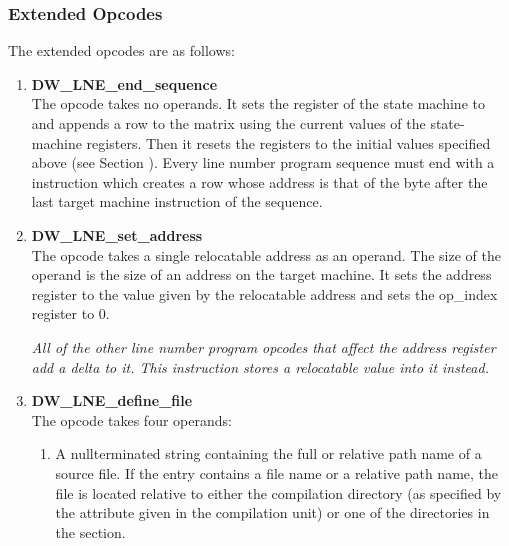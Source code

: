 \subsubsection{Extended Opcodes}
\label{chap:extendedopcodes}

The extended opcodes are as follows:

\begin{enumerate}[1. ]

\item \textbf{DW\-\_LNE\-\_end\-\_sequence} \\
The  opcode takes no operands. It sets the
register of the state machine to  and
appends a row to the matrix using the current values of the
state-machine registers. Then it resets the registers to the
initial values specified above 
(see Section ). 
Every line
number program sequence must end with a 
instruction which creates a row whose address is that of the
byte after the last target machine instruction of the sequence.

\item \textbf{DW\-\_LNE\-\_set\-\_address} \\
The  opcode takes a single relocatable
address as an operand. The size of the operand is the size
of an address on the target machine. It sets the address
register to the value given by the relocatable address and
sets the op\_index register to 0.

\textit{All of the other line number program opcodes that
affect the address register add a delta to it. This instruction
stores a relocatable value into it instead.}

\item \textbf{DW\-\_LNE\-\_define\-\_file} \\

The  opcode takes four operands:
\begin{enumerate}[1. ]

\item A null\dash terminated string containing the full or relative
path name of a source file. If the entry contains a file
name or a relative path name, the file is located relative
to either the compilation directory (as specified by the
 attribute given in the compilation unit)
or one of the directories in the 
 section.


\end{enumerate}
\end{enumerate}
